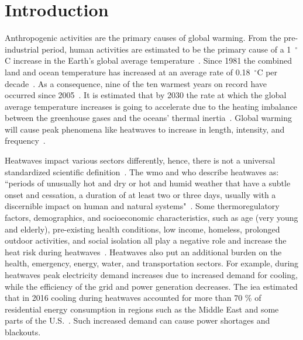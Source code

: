 
\section{Introduction}\label{sec:introduction}

Anthropogenic activities are the primary causes of global warming.
From the pre-industrial period, human activities are estimated to be the primary cause of a 1~$^{\circ}$C increase in the Earth's global average temperature~\cite{GlobalWa91:online}.
Since 1981 the combined land and ocean temperature has increased at an average rate of 0.18~$^{\circ}$C per decade~\cite{GlobalCl28:online}.
As a consequence, nine of the ten warmest years on record have occurred since 2005~\cite{ClimateC26:online}.
It is estimated that by 2030 the rate at which the global average temperature increases is going to accelerate due to the heating imbalance between the greenhouse gases and the oceans' thermal inertia~\cite{ClimateC26:online}.
Global warming will cause peak phenomena like heatwaves to increase in length, intensity, and frequency~\cite{Whatharm75:online}.

Heatwaves impact various sectors differently, hence, there is not a universal standardized scientific definition~\cite{Perkins2013}.
The \ac{wmo} and \ac{who} describe heatwaves as: ``periods of unusually hot and dry or hot and humid weather that have a subtle onset and cessation, a duration of at least two or three days, usually with a discernible impact on human and natural systems"~\cite{WMO2015}.
Some thermoregulatory factors, demographics, and socioeconomic characteristics, such as age (very young and elderly), pre-existing health conditions, low income, homeless, prolonged outdoor activities, and social isolation all play a negative role and increase the heat risk during heatwaves~\cite{WMO2015}.
Heatwaves also put an additional burden on the health, emergency, energy, water, and transportation sectors.
For example, during heatwaves peak electricity demand increases due to increased demand for cooling, while the efficiency of the grid and power generation decreases.
The \ac{iea} estimated that in 2016 cooling during heatwaves accounted for more than 70 \% of residential energy consumption in regions such as the Middle East and some parts of the U.S.~\cite{IEA2018}.
Such increased demand can cause power shortages and blackouts.

